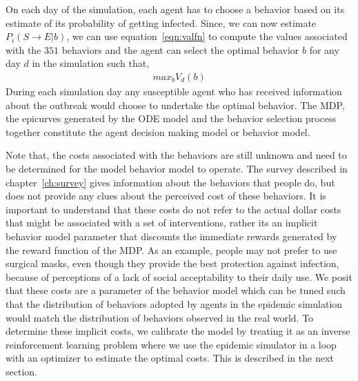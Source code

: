 \documentclass[doublespace,draft]{VTthesis}
\begin{document}
    On each day of the simulation, each agent has to choose a behavior based on its estimate of its probability of getting infected. Since, we can now estimate $P_i(S \rightarrow E|b)$, we can use equation~\ref{eqn:valfn} to compute the values associated with the $351$ behaviors and the agent can select the optimal behavior $b$ for any day $d$ in the simulation such that,
    \begin{align}
        max_{b} V_d(b)
    	\label{eqn:optb}
    \end{align}
    During each simulation day any susceptible agent who has received information about the outbreak would choose to undertake the optimal behavior. The MDP, the epicurves generated by the ODE model and the behavior selection process together constitute the agent decision making model or behavior model.  
    
    Note that, the costs associated with the behaviors are still unknown and need to be determined for the model behavior model to operate. The survey described in chapter~\ref{ch:survey} gives information about the behaviors that people do, but does not provide any clues about the perceived cost of these behaviors. It is important to understand that these costs do not refer to the actual dollar costs that might be associated with a set of interventions, rather its an implicit behavior model parameter that discounts the immediate rewards generated by the reward function of the MDP.
    As an example, people may not prefer to use surgical masks, even though they provide the best protection against infection, because of perceptions of a lack of social acceptability to their daily use. We posit that these costs are a parameter of the behavior model which can be tuned such that the distribution of behaviors adopted by agents in the epidemic simulation would match the distribution of behaviors observed in the real world. To determine these implicit costs, we calibrate the model by treating it as an inverse reinforcement learning problem where we use the epidemic simulator in a loop with an optimizer to estimate the optimal costs. This is described in the next section.
    
\end{document}
